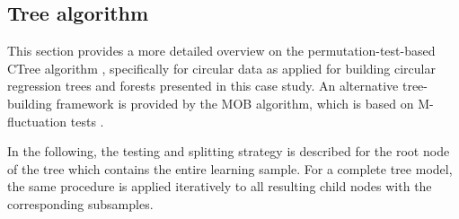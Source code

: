 \documentclass{statsoc}
\begin{document}
\newpage
\begin{appendix}

\section{Tree algorithm}
\label{app:algorithm}
This section provides a more detailed overview on the permutation-test-based
CTree algorithm \citep{Hothorn+Hornik+Zeileis:2006}, specifically for circular
data as applied for building circular regression trees and forests presented in
this case study. An alternative tree-building framework is provided by the MOB
algorithm, which is based on M-fluctuation tests \citep[see][for more
details]{Zeileis+Hothorn+Hornik:2008}.

In the following, the testing and splitting strategy is described for the root
node of the tree which contains the entire learning sample. For a complete
tree model, the same procedure is applied iteratively to all resulting child
nodes with the corresponding subsamples.


\end{appendix}
\end{document}
